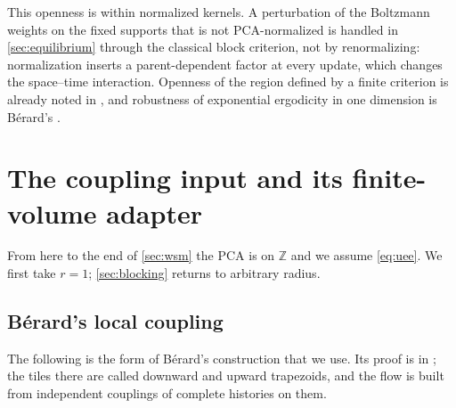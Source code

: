 \documentclass[11pt]{article}
\theoremstyle{plain}
\theoremstyle{definition}
\theoremstyle{remark}
\newcommand{\Z}{\mathbb{Z}}
\begin{document}
This openness is within normalized kernels. A perturbation of the Boltzmann weights on the fixed supports that is not PCA-normalized is handled in \cref{sec:equilibrium} through the classical block criterion, not by renormalizing: normalization inserts a parent-dependent factor at every update, which changes the space--time interaction. Openness of the region defined by a finite criterion is already noted in \cite[p.~242]{MS91}, and robustness of exponential ergodicity in one dimension is B\'erard's \cite[Corollary~1]{Berard23}.

\section{The coupling input and its finite-volume adapter}
\label{sec:coupling}

From here to the end of \cref{sec:wsm} the PCA is on $\Z$ and we assume \eqref{eq:uee}. We first take $r=1$; \cref{sec:blocking} returns to arbitrary radius.

\subsection{B\'erard's local coupling}

The following is the form of B\'erard's construction that we use. Its proof is in \cite[Theorem~1 and its proof, Section~3.2 and Lemma~9]{Berard23}; the tiles there are called downward and upward trapezoids, and the flow is built from independent couplings of complete histories on them.
\end{document}
